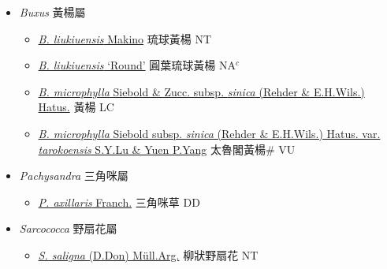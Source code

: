 
  \begin{itemize}
 \item[] \textit{Buxus} 黃楊屬
                    
  \begin{itemize}
        \item[] \href{http://www.theplantlist.org/tpl1.1/search?q=Buxus+liukiuensis}{\textit{B. liukiuensis} Makino}   琉球黃楊 NT
        \item[] \href{http://www.theplantlist.org/tpl1.1/search?q=Buxus+liukiuensis}{\textit{B. liukiuensis} ‘Round’}   圓葉琉球黃楊 NA$^c$
        \item[] \href{http://www.theplantlist.org/tpl1.1/search?q=Buxus+microphylla+subsp.+sinica}{\textit{B. microphylla} Siebold \& Zucc. subsp. \textit{sinica} (Rehder \& E.H.Wils.) Hatus.}   黃楊 LC
        \item[] \href{http://www.theplantlist.org/tpl1.1/search?q=Buxus+microphylla+subsp.+sinica+var.+tarokoensis}{\textit{B. microphylla} Siebold subsp. \textit{sinica} (Rehder \& E.H.Wils.) Hatus. var. \textit{tarokoensis} S.Y.Lu \& Yuen P.Yang}   太魯閣黃楊\# VU
  \end{itemize}
 \item[] \textit{Pachysandra} 三角咪屬
                    
  \begin{itemize}
        \item[] \href{http://www.theplantlist.org/tpl1.1/search?q=Pachysandra+axillaris}{\textit{P. axillaris} Franch.}   三角咪草 DD
  \end{itemize}
 \item[] \textit{Sarcococca} 野扇花屬
                    
  \begin{itemize}
        \item[] \href{http://www.theplantlist.org/tpl1.1/search?q=Sarcococca+saligna}{\textit{S. saligna} (D.Don) Müll.Arg.}   柳狀野扇花 NT
  \end{itemize}
  \end{itemize}

